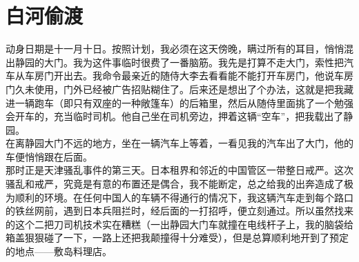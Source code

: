 \fancyhead[RO]{} %
\fancyhead[LE]{} %
\chapter*{白河偷渡}
\thispagestyle{empty}
动身日期是十一月十日。按照计划，我必须在这天傍晚，瞒过所有的耳目，悄悄混出静园的大门。我为这件事临时很费了一番脑筋。我先是打算不走大门，索性把汽车从车房门开出去。我命令最亲近的随侍大李去看看能不能打开车房门，他说车房门久未使用，门外已经被广告招贴糊住了。后来还是想出了个办法，这就是把我藏进一辆跑车（即只有双座的一种敞篷车）的后箱里，然后从随侍里面挑了一个勉强会开车的，充当临时司机。他自己坐在司机旁边，押着这辆“空车”，把我载出了静园。\\

在离静园大门不远的地方，坐在一辆汽车上等着，一看见我的汽车出了大门，他的车便悄悄跟在后面。\\

那时正是天津骚乱事件的第三天。日本租界和邻近的中国管区一带整日戒严。这次骚乱和戒严，究竟是有意的布置还是偶合，我不能断定，总之给我的出奔造成了极为顺利的环境。在任何中国人的车辆不得通行的情况下，我这辆汽车走到每个路口的铁丝网前，遇到日本兵阻拦时，经后面的一打招呼，便立刻通过。所以虽然找来的这个二把刀司机技术实在糟糕（一出静园大门车就撞在电线杆子上，我的脑袋给箱盖狠狠碰了一下，一路上还把我颠撞得十分难受），但是总算顺利地开到了预定的地点——敷岛料理店。\\

